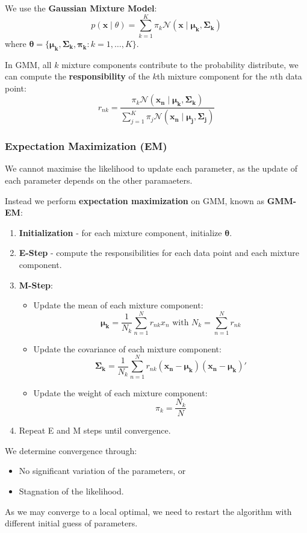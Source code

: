 \documentclass[11pt]{article}
\begin{document}
We use the \textbf{Gaussian Mixture Model}:
\[
  p(\bm{x} \mid \theta) = \sum_{k = 1}^K \pi_k \mathcal{N} (\bm{x} \mid \bm{\mu_k}, \bm{\Sigma_k})
\]
where $\bm{\theta} = \{ \bm{\mu_k}, \bm{\Sigma_k}, \bm{\pi_k} : k = 1, \dots, K \}$.

In GMM, all $k$ mixture components contribute to the probability distribute, we can compute the \textbf{responsibility} of the $k$th mixture component for the $n$th data point:
\[
  r_{nk} = \frac{\pi_k \mathcal{N}(\bm{x_n} \mid \bm{\mu_k}, \bm{\Sigma_k})}{\sum_{j = 1}^K \pi_j \mathcal{N} (\bm{x_n} \mid \bm{\mu_j}, \bm{\Sigma_j})
}
\]

\subsubsection{Expectation Maximization (EM)}
We cannot maximise the likelihood to update each parameter, as the update of each parameter depends on the other paramaeters.

Instead we perform \textbf{expectation maximization} on GMM, known as \textbf{GMM-EM}:
\begin{enumerate}
  \item \textbf{Initialization} - for each mixture component, initialize $\bm{\theta}$.
  \item \textbf{E-Step} - compute the responsibilities for each data point and each mixture component.
  \item \textbf{M-Step}:
    \begin{itemize}
      \item Update the mean of each mixture component:
        \[
          \bm{\mu_k} = \frac{1}{N_k} \sum_{n = 1}^N r_{nk} x_n \text{ with } N_k = \sum_{n = 1}^N r_{nk}
        \]
      \item Update the covariance of each mixture component:
        \[
          \bm{\Sigma_k} = \frac{1}{N_k}\sum_{n = 1}^N r_{nk} (\bm{x_n} - \bm{\mu_k})(\bm{x_n} - \bm{\mu_k})' 
        \]
      \item Update the weight of each mixture component:
        \[
          \pi_k = \frac{N_k}{N} 
        \]
    \end{itemize}
  \item Repeat E and M steps until convergence.
\end{enumerate}

We determine convergence through:
\begin{itemize}
  \item No significant variation of the parameters, or
  \item Stagnation of the likelihood.
\end{itemize}
As we may converge to a local optimal, we need to restart the algorithm with different initial guess of parameters.
\end{document}
